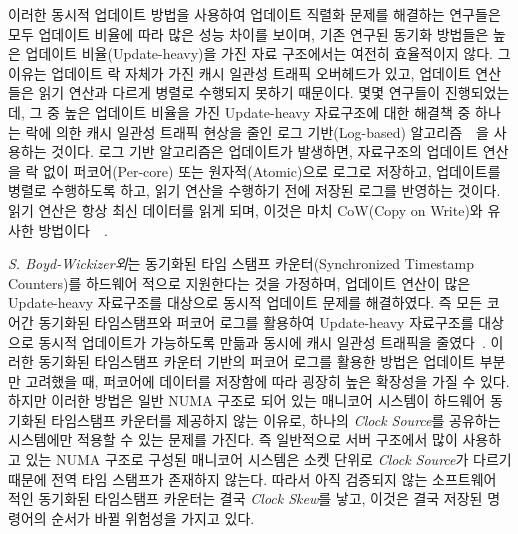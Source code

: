 이러한 동시적 업데이트 방법을 사용하여 업데이트 직렬화 문제를 해결하는 연구들은 모두 
업데이트 비율에 따라 많은 성능 차이를 보이며, 기존 연구된 동기화 방법들은 
높은 업데이트 비율(Update-heavy)을 가진 자료 구조에서는 여전히 효율적이지 않다.
그 이유는 업데이트 락 자체가 가진 캐시 일관성 트래픽 오버헤드가 있고, 업데이트 연산들은 읽기 연산과 
다르게 병렬로 수행되지 못하기 때문이다.
몇몇 연구들이 진행되었는데, 그 중 높은 업데이트 비율을 가진 Update-heavy 자료구조에 대한 해결책 
중 하나는 락에 의한 캐시 일관성 트래픽 현상을 줄인 로그 기반(Log-based)
알고리즘~\cite{Hendler2010FC}~\cite{SilasBoydWickizerPth}을 사용하는 것이다.
로그 기반 알고리즘은 업데이트가 발생하면, 자료구조의 업데이트 연산을 
락 없이 퍼코어(Per-core) 또는 원자적(Atomic)으로 로그로 저장하고, 업데이트를 병렬로 수행하도록 하고, 
읽기 연산을 수행하기 전에 저장된 로그를 반영하는 것이다.
읽기 연산은 항상 최신 데이터를 읽게 되며, 이것은 마치 CoW(Copy on Write)와
유사한 방법이다~\cite{PaulDetailLWN}~\cite{Morrison2016SSM}.

\textit{S. Boyd-Wickizer외}는 동기화된 타임 스탬프 카운터(Synchronized Timestamp
Counters)를 하드웨어 적으로 지원한다는 것을 가정하며, 업데이트 연산이 많은 Update-heavy 자료구조를 
대상으로 동시적 업데이트 문제를 해결하였다.
즉 모든 코어간 동기화된 타임스탬프와 퍼코어 로그를 활용하여 Update-heavy 자료구조를 대상으로 
동시적 업데이트가 가능하도록 만듦과 동시에 캐시 일관성 트래픽을 줄였다~\cite{SilasBoydWickizerPth}.
이러한 동기화된 타임스탬프 카운터 기반의 퍼코어 로그를 활용한 방법은
업데이트 부분만 고려했을 때, 퍼코어에 데이터를 저장함에 따라 굉장히 높은 확장성을 가질 수 있다.
하지만 이러한 방법은 일반 NUMA 구조로 되어 있는 매니코어 시스템이 
하드웨어 동기화된 타임스탬프 카운터를 제공하지 않는 이유로, 하나의 \textit{Clock Source}를 공유하는 
시스템에만 적용할 수 있는 문제를 가진다.
즉 일반적으로 서버 구조에서 많이 사용하고 있는 NUMA 구조로 구성된 매니코어 시스템은 소켓 단위로 
\textit{Clock Source}가 다르기 때문에 전역 타임 스탬프가 존재하지 않는다. 
따라서 아직 검증되지 않는 소프트웨어 적인 동기화된 타임스탬프 카운터는 결국 \textit{Clock Skew}를 낳고, 
이것은 결국 저장된 명령어의 순서가 바뀔 위험성을 가지고 있다.

